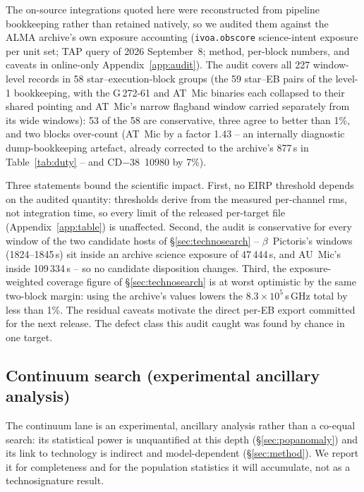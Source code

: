 \documentclass{openjournal}
\begin{document}
The on-source integrations quoted here were reconstructed from
pipeline bookkeeping rather than retained natively, so we audited them
against the ALMA archive's own exposure accounting
(\texttt{ivoa.obscore} science-intent exposure per unit set; TAP query
of 2026 September~8; method, per-block numbers, and caveats in
online-only Appendix~\ref{app:audit}). The audit covers all 227
window-level records in 58 star--execution-block groups (the 59
star--EB pairs of the level-1 bookkeeping, with the G\,272-61 and
AT~Mic binaries each collapsed to their shared pointing and AT~Mic's
narrow flagband window carried separately from its wide windows): 53
of the 58 are conservative, three agree to better than 1\%, and two
blocks over-count (AT~Mic by a factor 1.43 -- an internally diagnostic
dump-bookkeeping artefact, already corrected to the archive's 877\,s
in Table~\ref{tab:duty} -- and CD$-$38~10980 by 7\%).

Three statements bound the scientific impact. First, no EIRP
threshold depends on the audited quantity: thresholds derive from the
measured per-channel rms, not integration time, so every limit of
the released per-target file (Appendix~\ref{app:table}) is unaffected. Second, the audit is conservative
for every window of the two candidate hosts of
\S\ref{sec:technosearch} -- $\beta$~Pictoris's windows
(1824--1845\,s) sit inside an archive science exposure of
47\,444\,s, and AU~Mic's inside 109\,334\,s -- so no candidate
disposition changes. Third, the exposure-weighted coverage figure of
\S\ref{sec:technosearch} is at worst optimistic by the same two-block
margin: using the archive's values lowers the
$8.3\times10^{5}$\,s\,GHz total by less than 1\%. The residual
caveats motivate the direct per-EB export committed for the next
release. The defect class this audit caught was found by chance in
one target.


\subsection{Continuum search (experimental ancillary analysis)}
\label{sec:continuum}

The continuum lane is an experimental, ancillary analysis rather than
a co-equal search: its statistical power is unquantified at this depth
(\S\ref{sec:popanomaly}) and its link to technology is indirect and
model-dependent (\S\ref{sec:method}). We report it for completeness
and for the population statistics it will accumulate, not as a
technosignature result.
\end{document}
